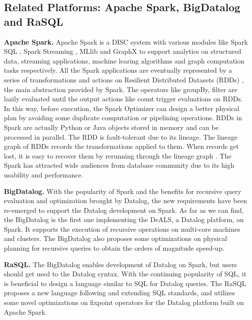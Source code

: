 \subsection{Related Platforms: Apache Spark, BigDatalog and RaSQL}
\textbf{Apache Spark.} Apache Spark is a DISC system with various modules like Spark SQL \citep{sparksql}, Spark Streaming \citep{sparkstreaming}, MLlib \citep{meng2016mllib} and GraphX \citep{gonzalez2014graphx} to support analytics on structured data, streaming applications, machine learing algorithms and graph computation tasks respectively.  All the Spark applications are eventually represented by a series of transformations and actions on Resilient Distributed Datasets (RDDs) \citep{dean2004mapreduce}, the main abstraction provided by Spark. The operators like groupBy, filter are lazily evaluated until the output actions like count trigger evaluations on RDDs. In this way, before execution, the Spark Optimizer can design a better physical plan by avoiding some duplicate computation or pipelining operations. RDDs in Spark are actually Python or Java objects stored in memory and can be processed in parallel. The RDD is fault-tolerant due to its lineage. The lineage graph of RDDs records the transformations applied to them. When records get lost, it is easy to recover them by rerunning through the lineage graph \citep{gulzar2017automated}. The Spark has attracted wide audiences from database community due to its high usability and performance.

\textbf{BigDatalog.}
With the popularity of Spark and the benefits for recursive query evaluation and optimization brought by Datalog, the new requirements have been re-emerged to support the Datalog development on Spark. 
As far as we can find, the BigDatalog \citep{shkapsky2016big} is the first one implementing the DeALS, a Datalog platform, on Spark. It supports the execution of recursive operations on  multi-core machines and clusters. The BigDatalog also proposes some optimizations on physical planning for recursive queries to obtain the orders of magnitude speed-up. 

\textbf{RaSQL.} 
The BigDatalog enables development of Datalog on Spark, but users should get used to the Datalog syntax. With the continuing popularity of SQL, it is beneficial to design a language similar to SQL for Datalog queries. The RaSQL \citep{gu2019rasql} proposes a new language following and extending SQL standards, and utilizes some novel optimizations on fixpoint operators for the Datalog platform built on Apache Spark.  


